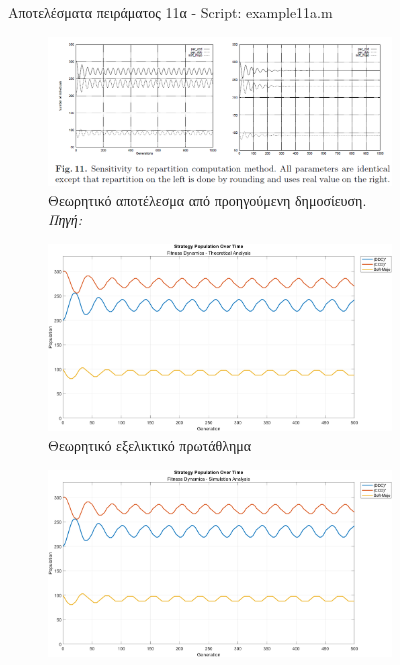 \documentclass[12pt]{report}
\begin{document}
\begin{figure}[htbp]
\begin{subfigure}[b]{0.5\linewidth}
    \end{subfigure}

    \caption{Αποτελέσματα πειράματος 11α - \foreignlanguage{english}{Script: example11a.m}}
    \label{fig:fig_fit_11a}
\end{figure}

\begin{figure}[htbp]
    \centering

    \begin{subfigure}[b]{0.5\linewidth}
        \centering
        \includegraphics[width=\linewidth]{Figures Fitness Dynamics/11.png}
        \caption{Θεωρητικό αποτέλεσμα από προηγούμενη δημοσίευση. \textit{Πηγή:} \protect\cite{mathieu1999}}
    \end{subfigure}
    \hfill
    \begin{subfigure}[b]{0.5\linewidth}
        \centering
        \includegraphics[width=\linewidth]{Figures Fitness Dynamics/example11b.png}
        \caption{Θεωρητικό εξελικτικό πρωτάθλημα}
        \label{fig:fig_fit_11b_b}
    \end{subfigure}
    \hfill
    \begin{subfigure}[b]{0.5\linewidth}
        \centering
        \includegraphics[width=\linewidth]{Figures Fitness Dynamics/example11b-sim.png}

\end{subfigure}
\end{figure}
\end{document}
